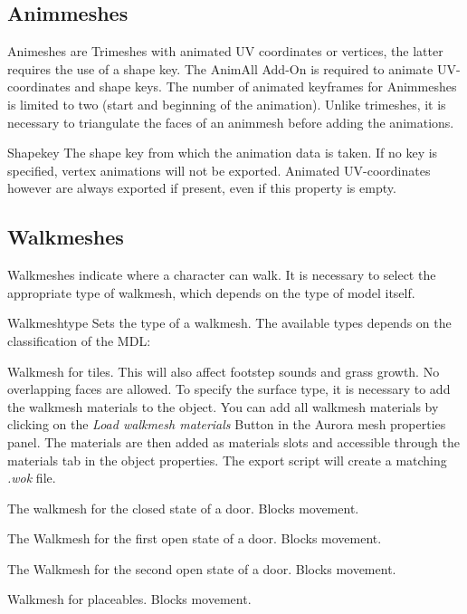 \subsection{Animmeshes}
Animeshes are Trimeshes with animated UV coordinates or vertices, the latter requires the use of a 
shape key. The AnimAll Add-On is required to animate UV-coordinates and shape keys. The number of 
animated keyframes for Animmeshes is limited to two (start and beginning of the animation). Unlike 
trimeshes, it is necessary to triangulate the faces of an animmesh before adding the animations. 

\begin{propertyAurora}{Shapekey} 
    The shape key from which the animation data is taken. If no key is specified, vertex animations will
    not be exported. Animated UV-coordinates however are always exported if present, even 
    if this property is empty.
\end{propertyAurora}

\subsection{Walkmeshes}
Walkmeshes indicate where a character can walk. It is necessary to select 
the appropriate type of walkmesh, which depends on the type of model itself. 

\begin{propertyAurora}{Walkmeshtype} 
Sets the type of a walkmesh. The available types depends on the classification of the MDL:
\begin{description}[leftmargin=10em,style=nextline]
    \item[Tileset] Walkmesh for tiles. This will also affect footstep sounds and grass growth. No overlapping faces are allowed. To specify the surface type, it is necessary to add the walkmesh materials to the object. You can add all walkmesh materials by clicking on the {\textit{Load walkmesh materials}} Button in the Aurora mesh properties panel. The materials are then added as materials slots and accessible through the materials tab in the object properties.
    The export script will create a matching {\textit{.wok}} file. 
    \item[Door: Closed] The walkmesh for the closed state of a door. Blocks movement.
    \item[Door: Open 1] The Walkmesh for the first open state of a door. Blocks movement.
    \item[Door: Open 2] The Walkmesh for the second open state of a door. Blocks movement.
    \item[Placeable] Walkmesh for placeables. Blocks movement.
\end{description}
\end{propertyAurora}

